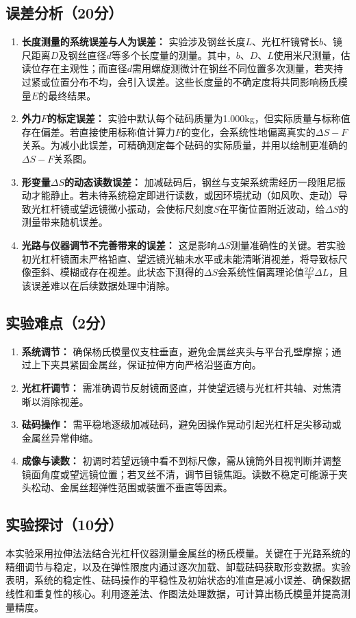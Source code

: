 \documentclass[]{../template/Report}%
\begin{document}
\begin{fullreportonly}
\subsection{误差分析（20分）}
\begin{enumerate}
\item \textbf{长度测量的系统误差与人为误差：} 实验涉及钢丝长度$L$、光杠杆镜臂长$b$、镜尺距离$D$及钢丝直径$d$等多个长度量的测量。其中，$b$、$D$、$L$使用米尺测量，估读位存在主观性；而直径$d$需用螺旋测微计在钢丝不同位置多次测量，若夹持过紧或位置分布不均，会引入误差。这些长度量的不确定度将共同影响杨氏模量$E$的最终结果。
\item \textbf{外力$F$的标定误差：} 实验中默认每个砝码质量为1.000kg，但实际质量与标称值存在偏差。若直接使用标称值计算力$F$的变化，会系统性地偏离真实的$\Delta S-F$关系。为减小此误差，可精确测定每个砝码的实际质量，并用以绘制更准确的$\Delta S-F$关系图。
\item \textbf{形变量$\Delta S$的动态读数误差：} 加减砝码后，钢丝与支架系统需经历一段阻尼振动才能静止。若未待系统稳定即进行读数，或因环境扰动（如风吹、走动）导致光杠杆镜或望远镜微小振动，会使标尺刻度$S$在平衡位置附近波动，给$\Delta S$的测量带来随机误差。
\item \textbf{光路与仪器调节不完善带来的误差：} 这是影响$\Delta S$测量准确性的关键。若实验初光杠杆镜面未严格铅直、望远镜光轴未水平或未能清晰消视差，将导致标尺像歪斜、模糊或存在视差。此状态下测得的$\Delta S$会系统性偏离理论值$\frac{2D}{b}\Delta L$，且该误差难以在后续数据处理中消除。
\end{enumerate}
\subsection{实验难点（2分）}
\begin{enumerate}
\item \textbf{系统调节：} 确保杨氏模量仪支柱垂直，避免金属丝夹头与平台孔壁摩擦；通过上下夹具紧固金属丝，保证拉伸方向严格沿竖直方向。
\item \textbf{光杠杆调节：} 需准确调节反射镜面竖直，并使望远镜与光杠杆共轴、对焦清晰以消除视差。
\item \textbf{砝码操作：} 需平稳地逐级加减砝码，避免因操作晃动引起光杠杆足尖移动或金属丝异常伸缩。
\item \textbf{成像与读数：} 初调时若望远镜中看不到标尺像，需从镜筒外目视判断并调整镜面角度或望远镜位置；若叉丝不清，调节目镜焦距。读数不稳定可能源于夹头松动、金属丝超弹性范围或装置不垂直等因素。
\end{enumerate}
\subsection{实验探讨（10分）}
本实验采用拉伸法法结合光杠杆仪器测量金属丝的杨氏模量。关键在于光路系统的精细调节与稳定，以及在弹性限度内通过逐次加载、卸载砝码获取形变数据。实验表明，系统的稳定性、砝码操作的平稳性及初始状态的准直是减小误差、确保数据线性和重复性的核心。利用逐差法、作图法处理数据，可计算出杨氏模量并提高测量精度。

\end{fullreportonly}
\end{document}
